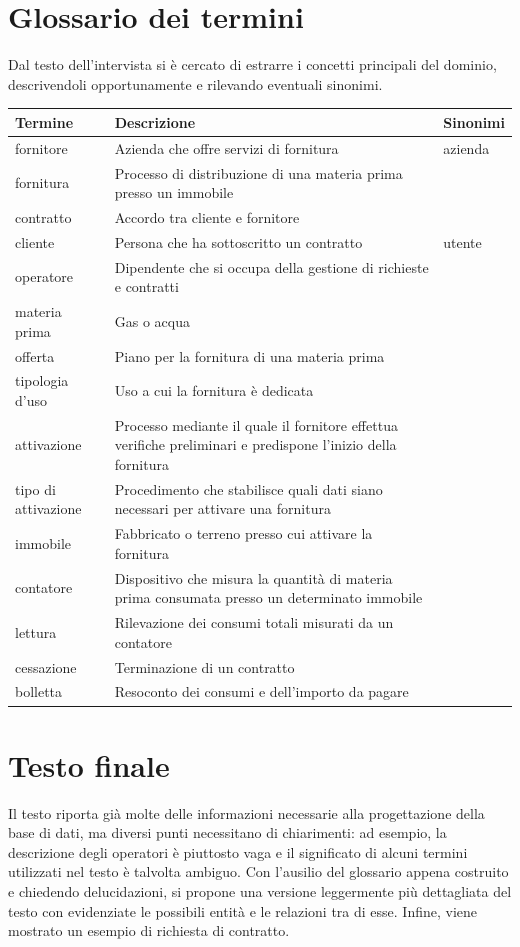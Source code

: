 \documentclass[a4paper,12pt]{report}
\begin{document}
\section{Glossario dei termini}
Dal testo dell'intervista si è cercato di estrarre i concetti principali del dominio, descrivendoli opportunamente e rilevando eventuali sinonimi.
\begin{longtable}{@{}p{3cm}| p{10cm} |p{3cm}@{}}
    \textbf{Termine} & \textbf{Descrizione} & \textbf{Sinonimi} \\ [0.5ex]
    \hline
    fornitore & Azienda che offre servizi di fornitura & azienda \\ 
    fornitura & Processo di distribuzione di una materia prima presso un immobile & \\
    contratto & Accordo tra cliente e fornitore & \\
    cliente & Persona che ha sottoscritto un contratto & utente \\
    operatore & Dipendente che si occupa della gestione di richieste e contratti & \\
    materia prima & Gas o acqua & \\
    offerta & Piano per la fornitura di una materia prima & \\
    tipologia d'uso & Uso a cui la fornitura è dedicata & \\
    attivazione & Processo mediante il quale il fornitore effettua verifiche preliminari e predispone l'inizio della fornitura & \\
    tipo di attivazione & Procedimento che stabilisce quali dati siano necessari per attivare una fornitura & \\
    immobile & Fabbricato o terreno presso cui attivare la fornitura & \\
    contatore & Dispositivo che misura la quantità di materia prima consumata presso un determinato immobile & \\
    lettura & Rilevazione dei consumi totali misurati da un contatore & \\
    cessazione & Terminazione di un contratto & \\
    bolletta & Resoconto dei consumi e dell'importo da pagare & \\
\end{longtable}

\section{Testo finale}
Il testo riporta già molte delle informazioni necessarie alla progettazione della base di dati, ma diversi punti necessitano di chiarimenti: ad esempio, la descrizione degli operatori è piuttosto vaga e il significato di alcuni termini utilizzati nel testo è talvolta ambiguo. Con l'ausilio del glossario appena costruito e chiedendo delucidazioni, si propone una versione leggermente più dettagliata del testo con evidenziate le possibili entità e le relazioni tra di esse. Infine, viene mostrato un esempio di richiesta di contratto.
\end{document}

